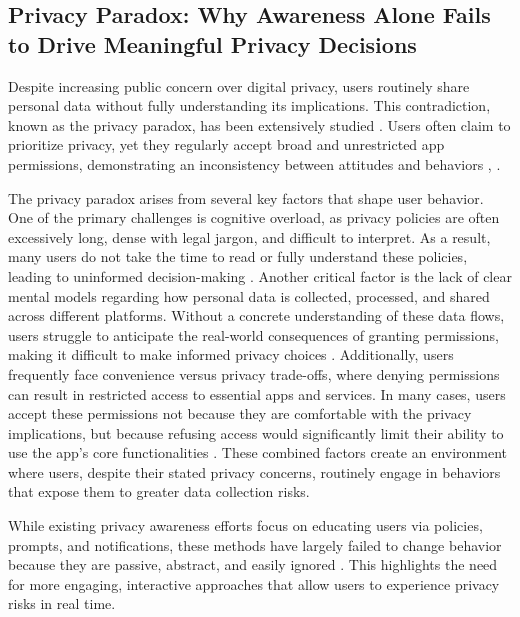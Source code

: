 \documentclass[acmlarge, nonacm]{acmart}
\begin{document}
\subsection{Privacy Paradox: Why Awareness Alone Fails to Drive Meaningful Privacy Decisions}

Despite increasing public concern over digital privacy, users routinely share personal data without fully understanding its implications. This contradiction, known as the privacy paradox, has been extensively studied \cite{Gerber2018Explaining}. Users often claim to prioritize privacy, yet they regularly accept broad and unrestricted app permissions, demonstrating an inconsistency between attitudes and behaviors \cite{baruh2017big}, \cite{barth2017privacy}.

The privacy paradox arises from several key factors that shape user behavior. One of the primary challenges is cognitive overload, as privacy policies are often excessively long, dense with legal jargon, and difficult to interpret. As a result, many users do not take the time to read or fully understand these policies, leading to uninformed decision-making \cite{Obar2018The}. Another critical factor is the lack of clear mental models regarding how personal data is collected, processed, and shared across different platforms. Without a concrete understanding of these data flows, users struggle to anticipate the real-world consequences of granting permissions, making it difficult to make informed privacy choices \cite{balebako2022nudging}. Additionally, users frequently face convenience versus privacy trade-offs, where denying permissions can result in restricted access to essential apps and services. In many cases, users accept these permissions not because they are comfortable with the privacy implications, but because refusing access would significantly limit their ability to use the app’s core functionalities \cite{Fleischhauer2022Paradox}. These combined factors create an environment where users, despite their stated privacy concerns, routinely engage in behaviors that expose them to greater data collection risks.

While existing privacy awareness efforts focus on educating users via policies, prompts, and notifications, these methods have largely failed to change behavior because they are passive, abstract, and easily ignored \cite{feng2021yaodesign}. This highlights the need for more engaging, interactive approaches that allow users to experience privacy risks in real time.
\end{document}
